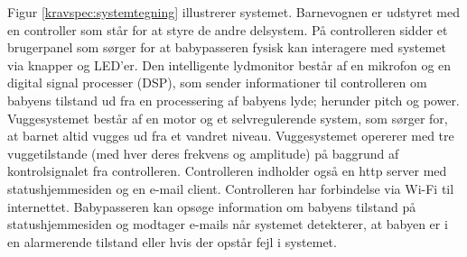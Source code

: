 Figur \ref{kravspec:systemtegning} illustrerer systemet. Barnevognen er udstyret med en controller som står for at styre de andre delsystem. På controlleren sidder et brugerpanel som sørger for at babypasseren fysisk kan interagere med systemet via knapper og LED'er.
Den intelligente lydmonitor består af en mikrofon og en digital signal processer (DSP), som sender informationer til controlleren om babyens tilstand ud fra en processering af babyens lyde; herunder pitch og power. Vuggesystemet består af en motor og et selvregulerende system, som sørger for, at barnet altid vugges ud fra et vandret niveau. Vuggesystemet opererer med tre vuggetilstande (med hver deres frekvens og amplitude) på baggrund af kontrolsignalet fra controlleren. Controlleren indholder også en http server med statushjemmesiden og en e-mail client. Controlleren har forbindelse via Wi-Fi til internettet. Babypasseren kan opsøge information om babyens tilstand på statushjemmesiden og modtager e-mails når systemet detekterer, at babyen er i en alarmerende tilstand eller hvis der opstår fejl i systemet.

